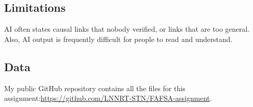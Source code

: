 \subsection*{Limitations}
AI often states causal links that nobody verified, or links that are too general.
Also, AI output is frequently difficult for people to read and understand.

\subsection*{Data}
My public GitHub repository contains all the files for this assignment:\newline\url{https://github.com/LNNRT-STN/FAFSA-assignment}.
